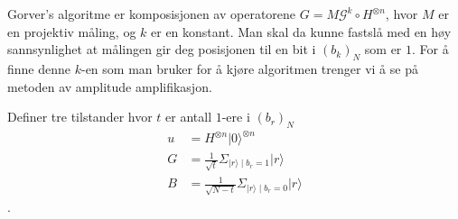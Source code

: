     Gorver's algoritme er komposisjonen av operatorene $G = M\mathcal{G}^k\circ H^{\otimes n}$, hvor $M$ er en projektiv måling, og $k$ er en konstant. Man skal da kunne fastslå med en høy sannsynlighet at målingen gir deg posisjonen til en bit i $(b_k)_N$ som er $1$. For å finne denne $k$-en som man bruker for å kjøre algoritmen trenger vi å se på metoden av amplitude amplifikasjon.

    Definer tre tilstander hvor $t$ er antall $1$-ere i $(b_r)_N$ 
    \begin{align*}
        u & = H^{\otimes n}|0\rangle^{\otimes n}\\
        G & = \frac{1}{\sqrt{t}}\Sigma_{|r\rangle \mid b_r = 1}|r\rangle\\ 
        B & = \frac{1}{\sqrt{N-t}}\Sigma_{|r\rangle\mid b_r = 0}|r\rangle
    \end{align*}. 

